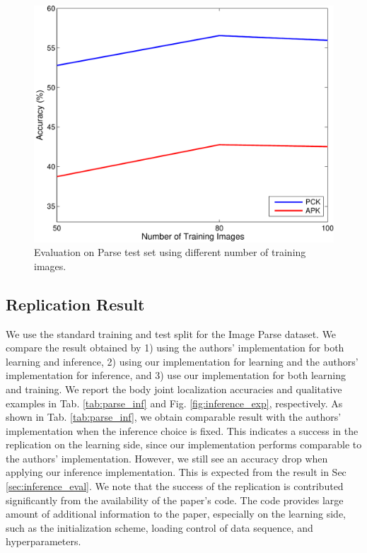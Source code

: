 \documentclass[10pt,twocolumn,letterpaper]{article}
\begin{document}
\begin{figure}[t]
  \center
  \includegraphics[width=0.90\linewidth]{figure/train_num.pdf}
  \caption{Evaluation on Parse test set using different number of training images.}
  \label{fig:train_num}
\end{figure}

\subsection{Replication Result}
\label{sec:learning_rep}

We use the standard training and test split for the Image Parse dataset. We compare the result obtained by 1) using the authors' implementation for both learning and inference, 2) using our implementation for learning and the authors' implementation for inference, and 3) use our implementation for both learning and training. We report the body joint localization accuracies and qualitative examples in Tab. \ref{tab:parse_inf} and Fig. \ref{fig:inference_exp}, respectively. As shown in Tab. \ref{tab:parse_inf}, we obtain comparable result with the authors' implementation when the inference choice is fixed. This indicates a success in the replication on the learning side, since our implementation performs comparable to the authors' implementation. However, we still see an accuracy drop when applying our inference implementation. This is expected from the result in Sec \ref{sec:inference_eval}. We note that the success of the replication is contributed significantly from the availability of the paper's code. The code provides large amount of additional information to the paper, especially on the learning side, such as the initialization scheme, loading control of data sequence, and hyperparameters.
\end{document}
